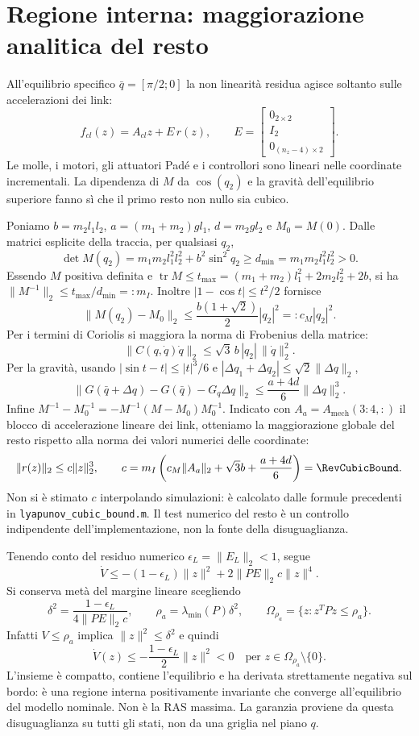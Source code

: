 \section{Regione interna: maggiorazione analitica del resto}
All'equilibrio specifico $\bar q=[\pi/2;0]$ la non linearità residua agisce
soltanto sulle accelerazioni dei link:
\[
f_{cl}(z)=A_{cl}z+E\,r(z),\qquad
E=\begin{bmatrix}0_{2\times2}\\I_2\\0_{(n_z-4)\times2}\end{bmatrix}.
\]
Le molle, i motori, gli attuatori Padé e i controllori sono lineari nelle
coordinate incrementali. La dipendenza di $M$ da $\cos(q_2)$ e la gravità
dell'equilibrio superiore fanno sì che il primo resto non nullo sia cubico.

Poniamo $b=m_2l_1l_2$, $a=(m_1+m_2)gl_1$, $d=m_2gl_2$ e $M_0=M(0)$.
Dalle matrici esplicite della traccia, per qualsiasi $q_2$,
\[
\det M(q_2)=m_1m_2l_1^2l_2^2+b^2\sin^2q_2
\ge d_{\min}=m_1m_2l_1^2l_2^2>0.
\]
Essendo $M$ positiva definita e
$\operatorname{tr}M\le t_{\max}=(m_1+m_2)l_1^2+2m_2l_2^2+2b$,
si ha $\|M^{-1}\|_2\le t_{\max}/d_{\min}=:m_I$.
Inoltre $|1-\cos t|\le t^2/2$ fornisce
\[
\|M(q_2)-M_0\|_2\le
\frac{b(1+\sqrt2)}{2}|q_2|^2=:c_M|q_2|^2 .
\]
Per i termini di Coriolis si maggiora la norma di Frobenius della matrice:
\[
\|C(q,\dot q)\dot q\|_2\le
\sqrt3\,b\,|q_2|\,\|\dot q\|_2^2 .
\]
Per la gravità, usando $|\sin t-t|\le |t|^3/6$ e
$|\Delta q_1+\Delta q_2|\le\sqrt2\|\Delta q\|_2$,
\[
\|G(\bar q+\Delta q)-G(\bar q)-G_q\Delta q\|_2
\le \frac{a+4d}{6}\|\Delta q\|_2^3 .
\]
Infine $M^{-1}-M_0^{-1}=-M^{-1}(M-M_0)M_0^{-1}$.
Indicato con $A_a=A_{\mathrm{mech}}(3{:}4,:)$ il blocco di accelerazione
lineare dei link, otteniamo la maggiorazione globale del resto rispetto
alla norma dei valori numerici delle coordinate:
\[
\|r(z)\|_2\le c\|z\|_2^3,\qquad
c=m_I\left(c_M\|A_a\|_2+\sqrt3 b+\frac{a+4d}{6}\right)
=\RevCubicBound .
\]
Non si è stimato $c$ interpolando simulazioni: è calcolato dalle formule
precedenti in \texttt{lyapunov\_cubic\_bound.m}. Il test numerico del resto
è un controllo indipendente dell'implementazione, non la fonte della disuguaglianza.

Tenendo conto del residuo numerico $\epsilon_L=\|E_L\|_2<1$, segue
\[
\dot V\le -(1-\epsilon_L)\|z\|^2
+2\|PE\|_2c\|z\|^4.
\]
Si conserva metà del margine lineare scegliendo
\[
\delta^2=\frac{1-\epsilon_L}{4\|PE\|_2c},\qquad
\rho_a=\lambda_{\min}(P)\delta^2,\qquad
\Omega_{\rho_a}=\{z:z^TPz\le\rho_a\}.
\]
Infatti $V\le\rho_a$ implica $\|z\|^2\le\delta^2$ e quindi
\[
\dot V(z)\le-\frac{1-\epsilon_L}{2}\|z\|^2<0
\quad\text{per }z\in\Omega_{\rho_a}\setminus\{0\}.
\]
L'insieme è compatto, contiene l'equilibrio e ha derivata strettamente negativa
sul bordo: è una regione interna positivamente invariante che converge
all'equilibrio del modello nominale. Non è la RAS massima.
La garanzia proviene da questa disuguaglianza su tutti gli stati, non da una
griglia nel piano $q$.

